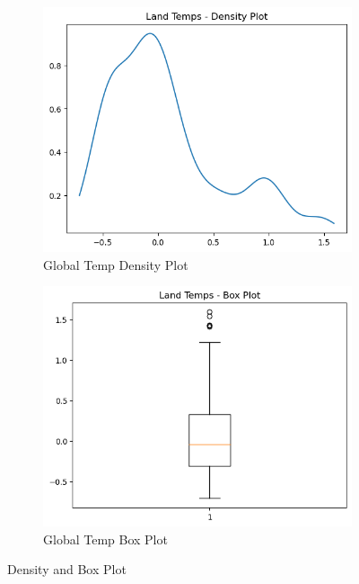\documentclass{article}
\begin{document}
\begin{figure}[H]
  \centering
  \begin{subfigure}[b]{0.45\textwidth}
    \includegraphics[width=\textwidth]{img/global_temp/density_plot.png}
    \caption{Global Temp Density Plot}
    \label{fig:global_tempdensity}
  \end{subfigure}
  \hfill
  \begin{subfigure}[b]{0.45\textwidth}
    \includegraphics[width=\textwidth]{img/global_temp/box_plot.png}
    \caption{Global Temp Box Plot}
    \label{fig:global_tempbox}
  \end{subfigure}
  \caption{Density and Box Plot}
  \label{fig:global_temp2}
\end{figure}
\end{document}
